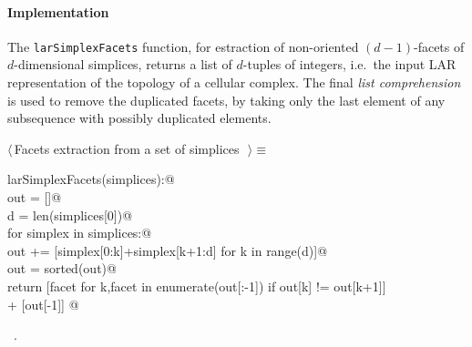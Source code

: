 \documentclass[11pt,oneside]{article}	%
\begin{document}
\paragraph{Implementation}

The \texttt{larSimplexFacets} function, for estraction of non-oriented $(d-1)$-facets of $d$-dimensional simplices, returns a list of $d$-tuples of integers, i.e.~the input LAR representation of the topology of a cellular complex. The final \emph{list comprehension} is used to remove the duplicated facets, by taking only the last element of any subsequence with possibly duplicated elements.
        
\begin{flushleft} \small
\begin{minipage}{\linewidth} \label{scrap8}
$\langle\,$Facets extraction from a set of simplices\nobreak\ {\footnotesize {}}$\,\rangle\equiv$
\vspace{-1ex}
\begin{list}{}{} \item
\mbox{}\verb@def larSimplexFacets(simplices):@\\
\mbox{}\verb@    out = []@\\
\mbox{}\verb@    d = len(simplices[0])@\\
\mbox{}\verb@    for simplex in simplices:@\\
\mbox{}\verb@        out += [simplex[0:k]+simplex[k+1:d] for k in range(d)]@\\
\mbox{}\verb@    out = sorted(out)@\\
\mbox{}\verb@    return [facet for k,facet in enumerate(out[:-1]) if out[k] != out[k+1]] \@\\
\mbox{}\verb@      + [out[-1]] @\\
\mbox{}\verb@@{\NWsep}
\end{list}
\vspace{-1ex}
\footnotesize\addtolength{\baselineskip}{-1ex}
\begin{list}{}{\setlength{\itemsep}{-\parsep}\setlength{\itemindent}{-\leftmargin}}
\item \NWtxtMacroRefIn\ .
\end{list}
\end{minipage}\\[4ex]
\end{flushleft}
\end{document}
